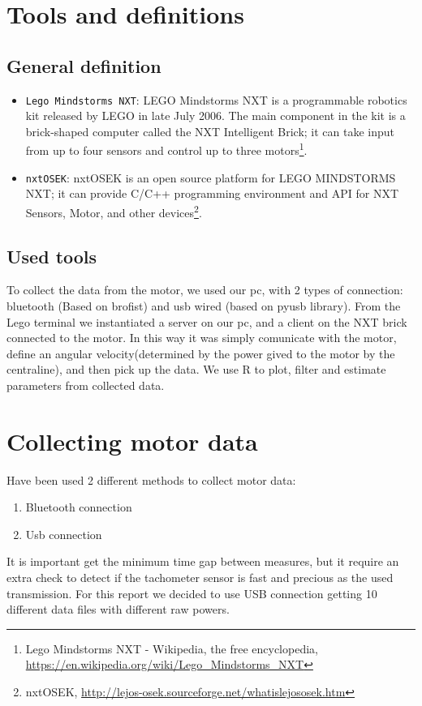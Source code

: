 \documentclass[a4paper,12pt,oneside]{article}
\begin{document}
\section{Tools and definitions}


\subsection{General definition}
\begin{itemize}
\item \texttt{Lego Mindstorms NXT}: LEGO Mindstorms NXT is a programmable robotics kit released by LEGO in late July 2006. The main component in the kit is a brick-shaped computer called the NXT Intelligent Brick; it can take input from up to four sensors and control up to three motors\footnote{Lego Mindstorms NXT - Wikipedia, the free encyclopedia, \url{https://en.wikipedia.org/wiki/Lego_Mindstorms_NXT}}.
\item \texttt{nxtOSEK}: nxtOSEK is an open source platform for LEGO MINDSTORMS NXT; it can provide C/C++ programming environment and API for NXT Sensors, Motor, and other devices\footnote{nxtOSEK, \url{http://lejos-osek.sourceforge.net/whatislejososek.htm}}.
\end{itemize}

\subsection{Used tools}
To collect the data from the motor, we used our pc, with 2 types of connection: bluetooth (Based on brofist) and usb wired (based on pyusb library). From the Lego terminal we instantiated a server on our pc, and a client on the NXT brick  connected to the motor. In this way it was simply comunicate with the motor, define an angular velocity(determined by the power gived to the motor by the centraline), and then pick up the data. We use R to plot, filter and estimate parameters from collected data. 

\section{Collecting motor data}
Have been used 2 different methods to collect motor data:
\begin{enumerate}
\item Bluetooth connection
\item Usb connection
\end{enumerate}
It is important get the minimum time gap between measures, but it require an extra check to detect if the tachometer sensor is fast and precious as the used transmission.
For this report we decided to use USB connection getting 10 different data files with different raw powers.
\end{document}
